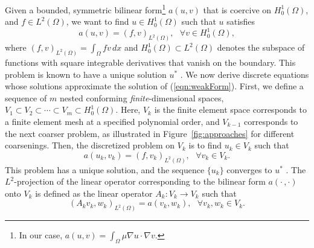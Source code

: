 \documentclass[smallcondensed,final]{svjour3}     %
\begin{document}
Given a bounded, symmetric bilinear form\footnote{In our case,
$a(u,v)=\int_\Omega \mu\nabla u \cdot \nabla v$.} $a(u,v)$ that is
coercive
on $H_0^{1}(\Omega)$, and $f \in L^{2}(\Omega)$, we want to find $u
\in H_0^{1}(\Omega)$ such that $u$ satisfies
\begin{equation}
\label{eqn:weakForm}
a(u,v) =  (f,v)_{L^2(\Omega)}, \ \ \ \forall v \in H_0^{1}(\Omega),
\end{equation}
where $(f,v)_{L^2(\Omega)} = \int_\Omega fv\,dx$ and
$H_0^1(\Omega)\subset L^2(\Omega)$ denotes the subspace of
functions with square integrable derivatives that vanish on the
boundary.
This problem is known to have a unique solution $u^*$ \cite{BrennerScott94}. 
We now derive discrete equations whose solutions
approximate the solution of
(\ref{eqn:weakForm}). First, we define a sequence of $m$ nested conforming
{\em finite}-dimensional spaces, $V_1 \subset V_2 \subset \cdots \subset V_m \subset
H_0^{1}(\Omega)$.
Here, $V_k$ is the finite element space corresponds to a finite element mesh
at a specified
polynomial order, and $V_{k-1}$ corresponds to the next coarser
problem,
as illustrated  in Figure~\ref{fig:approaches} for different coarsenings.  Then, the discretized problem on $V_k$ is to find
$u_k \in V_k$ such that
\begin{equation}
\label{eqn:galerkinForm}
a(u_{k},v_k) = (f,v_k)_{L^2(\Omega)}, \ \ \ \forall v_k \in V_k.
\end{equation}
This problem has a unique solution, and the sequence
$\{u_k\}$ converges to $u^*$ \cite{BrennerScott94}.
%
The $L^2$-projection of the linear operator corresponding to the
bilinear form $a(\cdot\,,\cdot)$ onto $V_k$ is defined as the linear
operator $A_k : V_{k} \rightarrow V_{k}$ such that
\begin{equation}
\label{eqn:fematDef}
(A_{k} v_k,w_k)_{L^2(\Omega)} = a(v_k,w_k),  \ \ \ \forall v_k,w_k \in V_k.
\end{equation}
\end{document}
